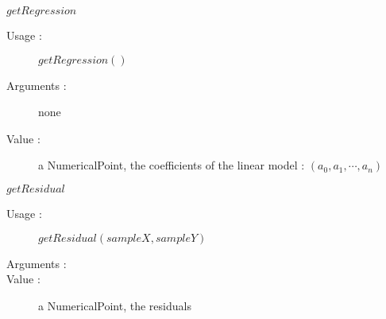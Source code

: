 \begin{description}
\begin{description}
  \item $getRegression$
    \begin{description}
    \item[Usage :] $getRegression()$
    \item[Arguments :] none
    \item[Value :] a NumericalPoint, the coefficients of the linear model : $(a_0, a_1, \cdots, a_n)$
    \end{description}
    \bigskip

  \item $getResidual$
    \begin{description}
    \item[Usage :] $getResidual(sampleX, sampleY)$
    \item[Arguments :]  \rule{0pt}{1em}
    \item[Value :] a NumericalPoint, the residuals
    \end{description}
  \end{description}
\end{description}


